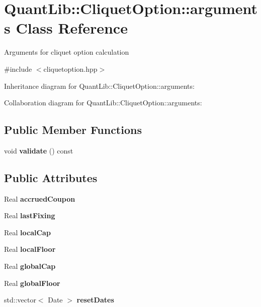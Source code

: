 \section{Quant\+Lib\+:\+:Cliquet\+Option\+:\+:arguments Class Reference}
\label{class_quant_lib_1_1_cliquet_option_1_1arguments}


Arguments for cliquet option calculation  




{\ttfamily \#include $<$cliquetoption.\+hpp$>$}



Inheritance diagram for Quant\+Lib\+:\+:Cliquet\+Option\+:\+:arguments\+:


Collaboration diagram for Quant\+Lib\+:\+:Cliquet\+Option\+:\+:arguments\+:
\subsection*{Public Member Functions}
\begin{DoxyCompactItemize}
\item 
void {\bfseries validate} () const \label{class_quant_lib_1_1_cliquet_option_1_1arguments_a8c1eb01db83dcb41348277f154e2c217}

\end{DoxyCompactItemize}
\subsection*{Public Attributes}
\begin{DoxyCompactItemize}
\item 
Real {\bfseries accrued\+Coupon}\label{class_quant_lib_1_1_cliquet_option_1_1arguments_ae7352eae17c9e05482555b9d3e53bc1f}

\item 
Real {\bfseries last\+Fixing}\label{class_quant_lib_1_1_cliquet_option_1_1arguments_af9effd484f8f325f78adc6c6c4e79bdb}

\item 
Real {\bfseries local\+Cap}\label{class_quant_lib_1_1_cliquet_option_1_1arguments_a6178a6b517029183655bda6fe52067d3}

\item 
Real {\bfseries local\+Floor}\label{class_quant_lib_1_1_cliquet_option_1_1arguments_a8284d6375f6d5e86650ff1b951f1cb4a}

\item 
Real {\bfseries global\+Cap}\label{class_quant_lib_1_1_cliquet_option_1_1arguments_a295b251282a95bef32509e1ac24a8345}

\item 
Real {\bfseries global\+Floor}\label{class_quant_lib_1_1_cliquet_option_1_1arguments_a990b4a9c4d9c2ec660ee152b06beca82}

\item 
std\+::vector$<$ Date $>$ {\bfseries reset\+Dates}\label{class_quant_lib_1_1_cliquet_option_1_1arguments_a7ea5b8341d59bc4ee4373c6e118a8e1b}

\end{DoxyCompactItemize}



